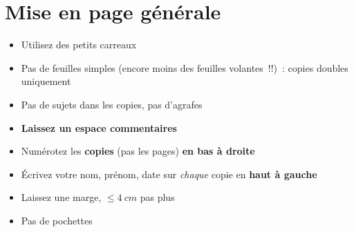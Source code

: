\documentclass[a4paper, 12pt, final, garamond]{book}
\begin{document}
\section{Mise en page générale}
\begin{itemize}[label=$\diamond$, leftmargin=10pt]
	\item Utilisez des petits carreaux
	\item Pas de feuilles simples (encore moins des feuilles volantes~!!)~: copies
	      doubles uniquement
	\item Pas de sujets dans les copies, pas d'agrafes
	\item \textbf{Laissez un espace commentaires}
	\item Numérotez les \textbf{copies} (pas les pages) \textbf{en bas à droite}
	\item Écrivez votre nom, prénom, date sur \textit{chaque} copie en
	      \textbf{haut à gauche}
	\item Laissez une marge, $\leq \SI{4}{cm}$ pas plus
	\item Pas de pochettes
\end{itemize}
\end{document}
